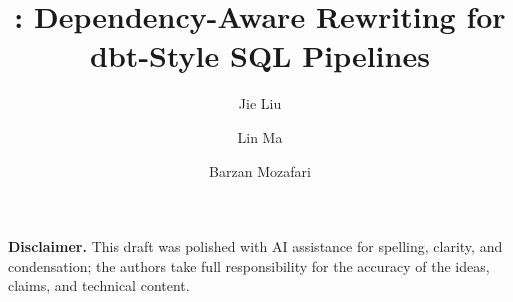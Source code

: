 \documentclass[sigconf, nonacm]{acmart}
\newcommand\vldbpagestyle{plain}
\begin{document}
\raggedbottom


\title{\tool: Dependency-Aware Rewriting for dbt-Style SQL Pipelines}




\author{Jie Liu}

\author{Lin Ma}

\author{Barzan Mozafari}

\renewcommand{\shortauthors}{Liu, Ma, and Mozafari}




\maketitle

\pagestyle{\vldbpagestyle}











% 

\vspace{0.75\baselineskip}
\noindent\textbf{Disclaimer.} This draft was polished with AI assistance for spelling, clarity, and condensation; the authors take full responsibility for the accuracy of the ideas, claims, and technical content.



\end{document}
